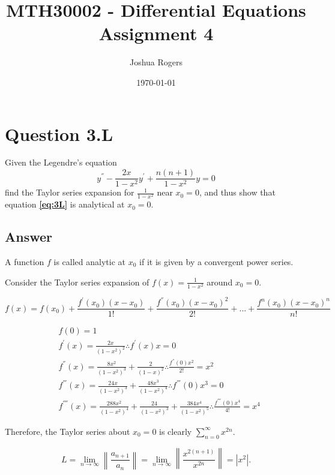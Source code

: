 \documentclass{article}
\title{\vspace{-4cm}MTH30002 - Differential Equations \\Assignment 4}
\author{Joshua Rogers}
\date\today
\begin{document}
\maketitle 

\section*{Question 3.L}
Given the Legendre's equation
\begin{equation}\label{eq:3L}
y^{''}-\frac{2x}{1-x^2}y^{'}+\frac{n(n+1)}{1-x^2}y=0
\end{equation}
find the Taylor series expansion for $\frac{1}{1-x^{2}}$ near $x_0 = 0$, and thus show that equation \textbf{\ref{eq:3L}} is analytical at $x_0 = 0$.


\subsection*{Answer}

A function $f$ is called analytic at $x_0$ if it is given by a convergent power series.

Consider the Taylor series expansion of $f(x) = \frac{1}{1-x^2}$ around $x_0 = 0$.

\begin{equation}
f(x) = f(x_0) + \frac{f^{'}(x_0)(x-x_0)}{1!} + \frac{f^{''}(x_0)(x-x_0)^{2}}{2!} + ... + \frac{f^{n}(x_0)(x-x_0)^{n}}{n!}
\end{equation}

\begin{align*}
&f(0) = 1\\
&f^{'}(x) = \frac{2x}{(1-x^2)^2} \therefore f^{'}(x)x = 0\\
&f^{''}(x) = \frac{8x^2}{(1-x^2)^3}+\frac{2}{(1-x)^2} \therefore \frac{f^{''}(0)x^2}{2!} = x^2\\
&f^{'''}(x) = \frac{24x}{(1-x^2)^3} + \frac{48x^3}{(1-x^2)^4} \therefore f^{'''}(0)x^3 = 0\\
&f^{''''}(x) = \frac{288x^2}{(1-x^2)^4}+\frac{24}{(1-x^2)^3}+\frac{384x^4}{(1-x^2)^5} \therefore \frac{f^{''''}(0)x^4}{4!} = x^4
\end{align*}



Therefore, the Taylor series about $x_0 = 0$ is clearly $\sum_{n=0}^{\infty} x^{2n}$.

\begin{equation}\label{limits1}
L = \lim_{n\to\infty} \left\| \frac{a_{n+1}}{a_n} \right\| = \lim_{n\to\infty}\left\|\frac{x^{2(n+1)}}{x^{2n}}\right\| = \left|x^2\right|. 
\end{equation}
\end{document}
